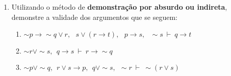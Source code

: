 \documentclass[12pt, a4paper,final]{article}
\begin{document}
\begin{enumerate}
\begin{enumerate}
\begin{comment}
\item $\{ p \vee q \rightarrow r,~ s \rightarrow \sim r \wedge \sim t,~ s \vee u \} ~\vdash~ p \rightarrow u$

\item $\{ p \rightarrow q,~ r \rightarrow t,~ s \rightarrow r,~ p \vee s \} ~\vdash~ \sim q \rightarrow t $

\end{comment}


\end{enumerate}


\item Utilizando o m\'etodo de {\bf demons\-tra\c c\~ao por absurdo ou indireta}, demonstre a validade dos argumentos que se seguem:

\begin{enumerate}





\item $\sim p \rightarrow \sim q \vee r,\:\: ~ s \vee (r \rightarrow t),\:\: ~ p \rightarrow s,\:\: ~ \sim s ~\vdash~ q \rightarrow t$


\item $ \sim r \vee \sim s, \:\: q \rightarrow s ~\vdash~ r \rightarrow \sim q$

\item \( \sim p \vee \sim q, \:\: r \vee s \rightarrow p, \:\: q \vee \sim s, \:\: \sim r ~\vdash~ \sim (r \vee s)\)




\end{enumerate}
\end{enumerate}
\end{document}
